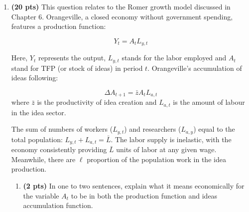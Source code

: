 \documentclass[14pt, oneside]{memoir}
\begin{document}
\begin{enumerate}[label=\textbf{\arabic*.}, itemsep=15pt]
\begin{enumerate}[label=(\alph*)]
	
	\newpage
	\item \textbf{(2 pts)}   What can we say about a country if its $\bar{A} = 1$?
	\vspace{1cm}
	\item[] \textbf{soln:} It has a TFP that is the same as the US.
	\vspace{2cm}
	\item \textbf{(2 pts)} What might help explain why $\bar{A} >1$?
	\vspace{1cm}
	\item[] \textbf{soln:} This implies TFP that is higher than the US. It can be because the country has a better human capital. 
	\vspace{2cm}
	\item \textbf{(2 pts)} What might cause the differences in $\alpha$?
	\vspace{1cm}
	\item[] \textbf{soln:}The answer to this lies in differences in capital intensities across countries. Note, generally speaking, developing countries have lower capital shares than developed countries, given the endowments of resources and prices of those resources
	
\end{enumerate}

\newpage

\item  \textbf{(20 pts)}\label{P5} This question relates to the Romer growth model discussed in Chapter 6. Orangeville, a closed economy without government spending, features a production function:

\[Y_t = A_t L_{y,t}\]

Here, \(Y_t\) represents the output, \(L_{y,t}\) stands for the labor employed and $A_t$ stand for TFP (or stock of ideas) in period \(t\). Orangeville's  accumulation of ideas  following:

\[\Delta A_{t+1} = \bar{z}A_t L_{a,t}\]
where $\bar{z}$ is the productivity of idea creation and $L_{a,t}$ is the amount of labour in the idea sector.

The sum of numbers of workers ($L_{y,t}$) and researchers ($L_{a,y}$) equal to the total population: $L_{y,t} + L_{a,t} = \bar{L}$.  The labor supply is inelastic, with the economy consistently providing \(\bar{L}\) units of labor at any given wage. Meanwhile, there are $\ell$ proportion of the population work in the idea production.

\begin{enumerate}[label=(\alph*)]
	\item \textbf{(2 pts)} In one to two sentences, explain what it means economically for the variable $A_t$ to be in both the production function and ideas accumulation function.
	

\end{enumerate}
\end{enumerate}
\end{document}
